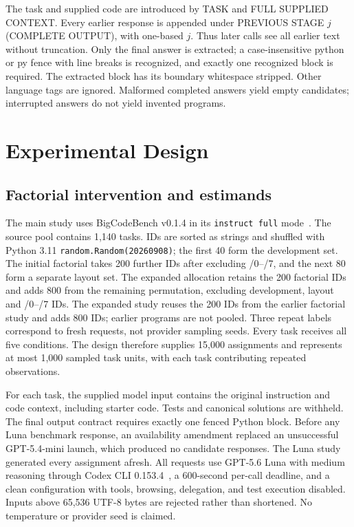 The task and supplied code are introduced by TASK and FULL SUPPLIED CONTEXT. Every earlier response is appended under PREVIOUS STAGE $j$ (COMPLETE OUTPUT), with one-based $j$. Thus later calls see all earlier text without truncation. Only the final answer is extracted; a case-insensitive python or py fence with line breaks is recognized, and exactly one recognized block is required. The extracted block has its boundary whitespace stripped. Other language tags are ignored. Malformed completed answers yield empty candidates; interrupted answers do not yield invented programs.

\section{Experimental Design}
\subsection{Factorial intervention and estimands}
The main study uses BigCodeBench v0.1.4 in its \texttt{instruct full} mode~\cite{zhuo2024bigcodebench}. The source pool contains 1,140 tasks. IDs are sorted as strings and shuffled with Python 3.11 \texttt{random.Random(20260908)}; the first 40 form the development set. The initial factorial takes 200 further IDs after excluding /0--/7, and the next 80 form a separate layout set. The expanded allocation retains the 200 factorial IDs and adds 800 from the remaining permutation, excluding development, layout and /0--/7 IDs. The expanded study reuses the 200 IDs from the earlier factorial study and adds 800 IDs; earlier programs are not pooled. Three repeat labels correspond to fresh requests, not provider sampling seeds. Every task receives all five conditions. The design therefore supplies 15,000 assignments and represents at most 1,000 sampled task units, with each task contributing repeated observations.

For each task, the supplied model input contains the original instruction and code context, including starter code. Tests and canonical solutions are withheld. The final output contract requires exactly one fenced Python block. Before any Luna benchmark response, an availability amendment replaced an unsuccessful GPT-5.4-mini launch, which produced no candidate responses. The Luna study generated every assignment afresh. All requests use GPT-5.6 Luna with medium reasoning through Codex CLI 0.153.4~\cite{openai56luna2026,codexexec2026}, a 600-second per-call deadline, and a clean configuration with tools, browsing, delegation, and test execution disabled. Inputs above 65,536 UTF-8 bytes are rejected rather than shortened. No temperature or provider seed is claimed.

